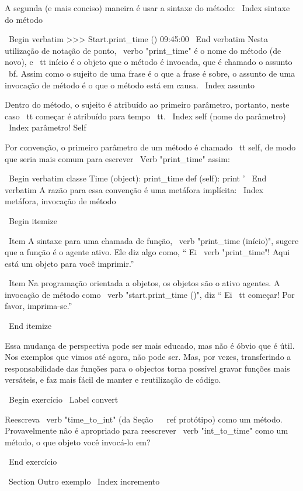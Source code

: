 \documentclass[10pt]{book}
\begin{document}
\begin {itemize}
{{{{{{{{{{{{{{A segunda (e mais conciso) maneira é usar a sintaxe do método:
\ Index {sintaxe do método}

\ Begin {verbatim}
>>> Start.print_time ()
09:45:00
\ End {verbatim}
%
Nesta utilização de notação de ponto, \ verbo "print_time" é o nome do
método (de novo), e {\ tt início} é o objeto que o método é
invocada, que é chamado o assunto {\ bf}. Assim como o
sujeito de uma frase é o que a frase é sobre, o assunto
de uma invocação de método é o que o método está em causa.
\ Index {assunto}

Dentro do método, o sujeito é atribuído ao primeiro
parâmetro, portanto, neste caso {\ tt começar} é atribuído
para {tempo \ tt}.
\ Index {self (nome do parâmetro)}
\ Index {parâmetro! Self}

Por convenção, o primeiro parâmetro de um método é
chamado {\ tt self}, de modo que seria mais comum para escrever
\ Verb "print_time" assim:

\ Begin {verbatim}
classe Time (object):
    print_time def (self):
        print '%
\ End {verbatim}
%
A razão para essa convenção é uma metáfora implícita:
\ Index {metáfora, invocação de método}

\ Begin {itemize}

\ Item A sintaxe para uma chamada de função, \ verb "print_time (início)",
  sugere que a função é o agente ativo. Ele diz algo
  como, `` Ei \ verb "print_time"! Aqui está um objeto para você imprimir.''

\ Item Na programação orientada a objetos, os objetos são o ativo
  agentes. A invocação de método como \ verb "start.print_time ()", diz
  `` Ei {\ tt começar}! Por favor, imprima-se.''

\ End {itemize}

Essa mudança de perspectiva pode ser mais educado, mas não é óbvio
que é útil. Nos exemplos que vimos até agora, não pode
ser. Mas, por vezes, transferindo a responsabilidade das funções para o
objectos torna possível gravar funções mais versáteis, e faz
mais fácil de manter e reutilização de código.

\ Begin {} exercício
\ Label {convert}

Reescreva \ verb "time_to_int" (da Seção ~ \ ref {} protótipo) como um método.
Provavelmente não é apropriado para reescrever \ verb "int_to_time" como um
método, o que objeto você invocá-lo em?

\ End {} exercício


\ Section {Outro exemplo}
\ Index {incremento}

}}}}}}}}}}}}}}
\end{itemize}
\end{document}
